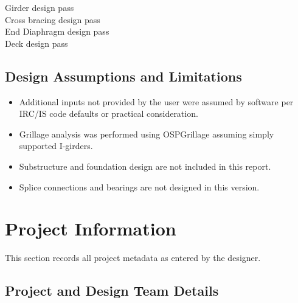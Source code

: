 \documentclass[12pt,a4paper]{report}
\numberwithin{table}{chapter}
\numberwithin{figure}{chapter}
\renewcommand{\arraystretch}{1.12}
\newcommand{\ReportSectionStyle}{\small\setlength{\tabcolsep}{3pt}\renewcommand{\arraystretch}{1.15}}
\newcommand{\ReportHeadingFont}{\Large}
\begin{document}
\noindent Girder design pass \\
Cross bracing design pass \\
End Diaphragm design pass \\
Deck design pass

\section*{Design Assumptions and Limitations}
\label{sec:assumptions}

\begin{itemize}
\item Additional inputs not provided by the user were assumed by software per IRC/IS code defaults or practical consideration.
\item Grillage analysis was performed using OSPGrillage assuming simply supported I-girders.
\item Substructure and foundation design are not included in this report.
\item Splice connections and bearings are not designed in this version.
\end{itemize}

\titleformat{\chapter}[block]{\normalfont\ReportHeadingFont\bfseries\centering}{\thechapter}{1em}{}
\titlespacing*{\chapter}{0pt}{-30pt}{10pt}

\ReportSectionStyle

\chapter{Project Information}

This section records all project metadata as entered by the designer.

\section{Project and Design Team Details}
\label{sec:project-details}
\end{document}
